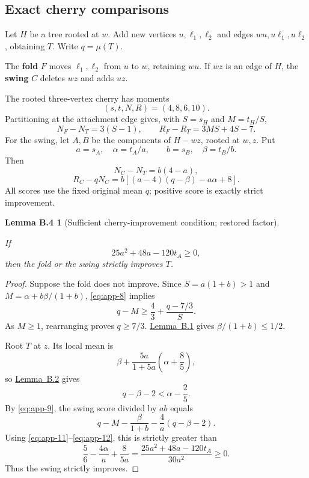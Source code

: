 \documentclass[11pt,letterpaper]{article}
\theoremstyle{plain}
\newtheorem*{applemmafour}{Lemma B.4}
\begin{document}
\subsection{Exact cherry comparisons}\label{b.3.-exact-cherry-comparisons}

Let \(H\) be a tree rooted at \(w\). Add new vertices \(u,\ell_1,\ell_2\) and edges \(wu,u\ell_1,u\ell_2\), obtaining \(T\). Write \(q=\mu(T)\).

The \textbf{fold} \(F\) moves \(\ell_1,\ell_2\) from \(u\) to \(w\), retaining \(wu\). If \(wz\) is an edge of \(H\), the \textbf{swing} \(C\) deletes \(wz\) and adds \(uz\).

The rooted three-vertex cherry has moments \[
(s,t,N,R)=(4,8,6,10).
\] Partitioning at the attachment edge gives, with \(S=s_H\) and \(M=t_H/S\), \[
N_F-N_T=3(S-1),\qquad R_F-R_T=3MS+4S-7.
\tag{B.8}\label{eq:app-8}
\] For the swing, let \(A,B\) be the components of \(H-wz\), rooted at \(w,z\). Put \[
a=s_A,\quad \alpha=t_A/a,\qquad b=s_B,\quad \beta=t_B/b.
\] Then \[
N_C-N_T=b(4-a),
\] \[
R_C-qN_C=b[(a-4)(q-\beta)-a\alpha+8].
\tag{B.9}\label{eq:app-9}
\] All scores use the fixed original mean \(q\); positive score is exactly strict improvement.

\begin{applemmafour}[Sufficient cherry-improvement condition; restored factor]\label{lem:app-4}

If \[
25a^2+48a-120t_A\ge0,
\tag{B.10}\label{eq:app-10}
\] then the fold or the swing strictly improves \(T\).

\end{applemmafour}

\begin{proof} Suppose the fold does not improve. Since \(S=a(1+b)>1\) and \(M=\alpha+b\beta/(1+b)\), \eqref{eq:app-8} implies \[
q-M\ge\frac43+\frac{q-7/3}{S}.
\tag{B.11}\label{eq:app-11}
\] As \(M\ge1\), rearranging proves \(q\ge7/3\). \hyperref[lem:app-1]{Lemma~B.1} gives \(\beta/(1+b)\le1/2\).

Root \(T\) at \(z\). Its local mean is \[
\beta+\frac{5a}{1+5a}\left(\alpha+\frac85\right),
\] so \hyperref[lem:app-2]{Lemma~B.2} gives \[
q-\beta-2<\alpha-\frac25.
\tag{B.12}\label{eq:app-12}
\] By \eqref{eq:app-9}, the swing score divided by \(ab\) equals \[
q-M-\frac{\beta}{1+b}-\frac4a(q-\beta-2).
\] Using \eqref{eq:app-11}--\eqref{eq:app-12}, this is strictly greater than \[
\frac56-\frac{4\alpha}{a}+\frac{8}{5a}
=\frac{25a^2+48a-120t_A}{30a^2}\ge0.
\] Thus the swing strictly improves. \end{proof}
\end{document}
